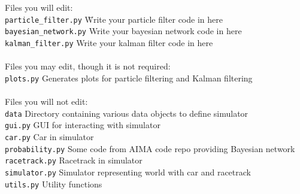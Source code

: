 \documentclass[a4paper]{article}
\begin{document}
\begin{tabbing}
    Files you will edit:\\
    \texttt{particle\_filter.py} \hspace{2em} \= Write your particle filter code in here \\
    \texttt{bayesian\_network.py} \> Write your bayesian network code in here\\
    \texttt{kalman\_filter.py} \> Write your kalman filter code in here\\\\
    
    Files you may edit, though it is not required:\\
    \texttt{plots.py} \> Generates plots for particle filtering and Kalman filtering\\\\
    
    Files you will not edit:\\
    \texttt{data} \> Directory containing various data objects to define simulator \\
    \texttt{gui.py} \> GUI for interacting with simulator\\
    \texttt{car.py} \> Car in simulator\\
    \texttt{probability.py} \> Some code from AIMA code repo providing Bayesian network\\
    \texttt{racetrack.py} \> Racetrack in simulator\\
    \texttt{simulator.py} \> Simulator representing world with car and racetrack\\
    \texttt{utils.py} \> Utility functions
\end{tabbing}
\end{document}
